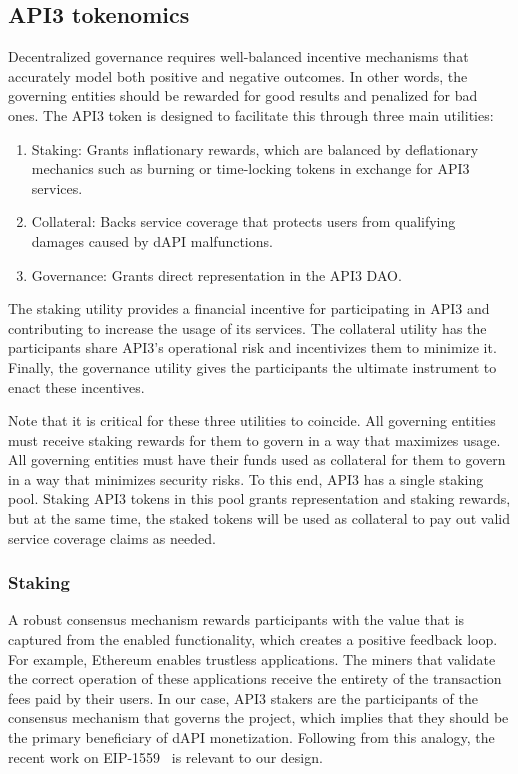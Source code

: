 \documentclass[11pt]{article}
\begin{document}
\subsection{API3 tokenomics}
\label{sec:api3-tokenomics}

Decentralized governance requires well-balanced incentive mechanisms that accurately model both positive and negative outcomes.
In other words, the governing entities should be rewarded for good results and penalized for bad ones.
The API3 token is designed to facilitate this through three main utilities:

\begin{enumerate}
    \item Staking: Grants inflationary rewards, which are balanced by deflationary mechanics such as burning or time-locking tokens in exchange for API3 services.
    \item Collateral: Backs service coverage that protects users from qualifying damages caused by dAPI malfunctions.
    \item Governance: Grants direct representation in the API3 DAO.
\end{enumerate}

The staking utility provides a financial incentive for participating in API3 and contributing to increase the usage of its services.
The collateral utility has the participants share API3’s operational risk and incentivizes them to minimize it.
Finally, the governance utility gives the participants the ultimate instrument to enact these incentives.

Note that it is critical for these three utilities to coincide.
All governing entities must receive staking rewards for them to govern in a way that maximizes usage.
All governing entities must have their funds used as collateral for them to govern in a way that minimizes security risks.
To this end, API3 has a single staking pool.
Staking API3 tokens in this pool grants representation and staking rewards, but at the same time, the staked tokens will be used as collateral to pay out valid service coverage claims as needed.

\subsubsection{Staking}
\label{sec:staking}

A robust consensus mechanism rewards participants with the value that is captured from the enabled functionality, which creates a positive feedback loop.
For example, Ethereum enables trustless applications.
The miners that validate the correct operation of these applications receive the entirety of the transaction fees paid by their users.
In our case, API3 stakers are the participants of the consensus mechanism that governs the project, which implies that they should be the primary beneficiary of dAPI monetization.
Following from this analogy, the recent work on EIP-1559~\cite{eip1559} is relevant to our design.
\end{document}
